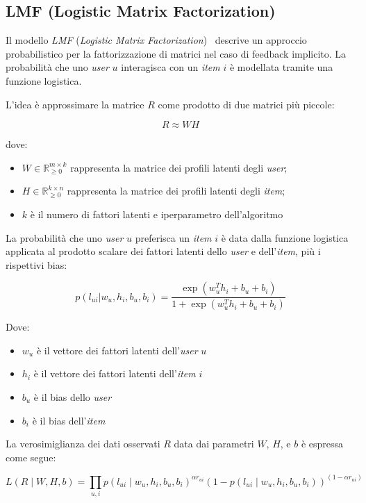 \subsection{LMF (Logistic Matrix Factorization)}\label{lmf-logistic-matrix-factorization}

Il modello \textit{LMF} (\textit{Logistic Matrix Factorization})~\cite{LMF} descrive un approccio probabilistico per la fattorizzazione di matrici nel caso di feedback implicito. La probabilità che uno \textit{user} $u$ interagisca con un \textit{item} $i$ è modellata tramite una funzione logistica.

L'idea è approssimare la matrice $R$ come prodotto di due matrici più piccole:

\[
R \approx WH
\]

dove:
\begin{itemize}
    \item $W \in \mathbb{R}_{\geq 0}^{m \times k}$ rappresenta la matrice dei profili latenti degli \textit{user};
    \item $H \in \mathbb{R}_{\geq 0}^{k \times n}$ rappresenta la matrice dei profili latenti degli \textit{item};
    \item $k$ è il numero di fattori latenti e iperparametro dell'algoritmo
\end{itemize}

La probabilità che uno \textit{user} $u$ preferisca un \textit{item} $i$ è data dalla funzione logistica applicata al prodotto scalare dei fattori latenti dello \textit{user} e dell'\textit{item}, più i rispettivi bias:

\[
p(l_{ui} | w_u, h_i, b_u, b_i) = \frac{\exp(w_u^T h_i + b_u + b_i)}{1 + \exp(w_u^T h_i + b_u + b_i)}
\]

Dove:
\begin{itemize}
    \item $w_u$ è il vettore dei fattori latenti dell'\textit{user} $u$
    \item $h_i$ è il vettore dei fattori latenti dell'\textit{item} $i$
    \item $b_u$ è il bias dello \textit{user}
    \item $b_i$ è il bias dell'\textit{item}
\end{itemize}

La verosimiglianza dei dati osservati $R$ data dai parametri $W$, $H$, e $b$ è espressa come segue:

\[
L(R \mid W, H, b) = \prod_{u, i} p(l_{ui} \mid w_u, h_i, b_u, b_i)^{\alpha r_{ui}} 
\left( 1 - p(l_{ui} \mid w_u, h_i, b_u, b_i) \right)^{(1 - \alpha r_{ui})}
\]

